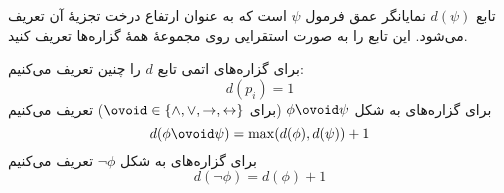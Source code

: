 تابع $d(\psi)$ نمایانگر عمق فرمول $\psi$ است که به عنوان ارتفاع درخت تجزیهٔ آن تعریف می‌شود. این تابع را به صورت استقرایی روی مجموعهٔ همهٔ گزاره‌ها تعریف کنید.
\begin{ans}
برای گزاره‌های اتمی تابع $d$ را چنین تعریف می‌کنیم:
$$d(p_i)=1$$
برای گزاره‌های به شکل
$\phi\ovoid\psi$
(برای $\ovoid\in\{\wedge,\vee,\to,\leftrightarrow\}$)
تعریف می‌کنیم
$$d(\phi\ovoid\psi)=\max(d(\phi),d(\psi))+1$$
برای گزاره‌های به شکل
$\neg\phi$
تعریف می‌کنیم
$$d(\neg\phi)=d(\phi)+1$$
\end{ans}
